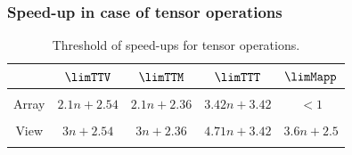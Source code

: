\begin{frame}
\frametitle{Speed-up in case of tensor operations}
\begin{table}[tp]%
\label{tab:map}%
\centering %
\begin{tabular}{c|cccc}
          & $\limTTV$   & $\limTTM$   & $\limTTT$  &  $\limMapp$\\
\hline\\
Array    & $2.1n+2.54$  & $2.1n+2.36$ & $3.42n+3.42$ &  $<1$ \\
\\
View     & $3n+2.54$    & $3n+2.36$   & $4.71n+3.42$ & $3.6n+2.5$ \\
\\
\end{tabular}
\caption{Threshold of speed-ups for tensor operations.}
\end{table}

\end{frame}
